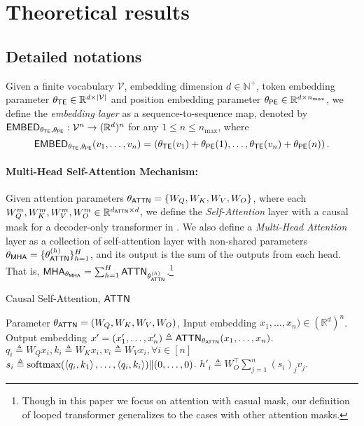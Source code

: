 \section{Theoretical results}\label{sec:appendix_proof}




\subsection{Detailed notations}
\label{sec:apx_detailed_notation}

\begin{definition}\label{defi:embedding_layer}
Given a finite vocabulary $\mathcal{V}$, embedding dimension $d\in\mathbb{N}^+$, token embedding parameter $\theta_{\mathsf{TE}}\in\mathbb{R}^{d\times |\mathcal{V}|}$ and position embedding parameter $\theta_{\mathsf{PE}}\in \mathbb{R}^{d\times n_{\max}}$, we define the \emph{embedding layer} as a sequence-to-sequence map, denoted by $\mathsf{EMBED}_{\theta_{\mathsf{TE}},\theta_{\mathsf{PE}}}:\mathcal{V}^n\to (\mathbb{R}^d)^n$ for any $1\le n\le n_{\max}$, where
\begin{equation}
    \mathsf{EMBED}_{\theta_{\mathsf{TE}},\theta_{\mathsf{PE}}}(v_1,\ldots,v_n) = \left(\theta_{\mathsf{TE}}(v_1)+ \theta_{\mathsf{PE}}(1), \ldots, \theta_{\mathsf{TE}}(v_n)+ \theta_{\mathsf{PE}}(n)  \right). 
\end{equation}
\end{definition}

\paragraph{Multi-Head Self-Attention Mechanism:} Given attention parameters $\theta_{\mathsf{ATTN}} = \{W_Q, W_K, W_V, W_O\}$, where each $W_Q^m, W_K^m, W_V^m, W_O^m \in \mathbb{R}^{d_{\mathsf{ATTN}} \times d }$, we define the \emph{Self-Attention} layer with a causal mask for a decoder-only transformer in . We also define a \emph{Multi-Head Attention} layer as a collection of self-attention layer with non-shared parameters $\theta_{\mathsf{MHA}} = \{\theta_{\mathsf{ATTN}}^{(h)}\}_{h=1}^H$, and its output is the sum of the outputs from each head. That is, $\mathsf{MHA}_{\theta_{\mathsf{MHA}}} = \sum_{h=1}^H \mathsf{ATTN}_{\theta_{\mathsf{ATTN}}^{(h)}}$.\footnote{Though in this paper we focus on attention with casual mask, our definition of looped transformer generalizes to the cases with other attention masks.}

\begin{algorithm}
    \caption{Causal Self-Attention, $\mathsf{ATTN}$}\label{alg:defi_attn}
    \begin{algorithmic}[1]
    \Require  Parameter $\theta_{\mathsf{ATTN}} = (W_Q,W_K,W_V,W_O)$, Input embedding $ x_1,\ldots, x_n)\in \left(\mathbb{R}^{d}\right)^n$.
    \Ensure Output embedding $x'= (x'_1,\ldots, x'_n) \triangleq \mathsf{ATTN}_{\theta_{\mathsf{ATTN}}}(x_1,\ldots, x_n)$.
    \State $q_i \triangleq W_Q  x_i, k_i \triangleq W_K x_i, v_i \triangleq W_V x_i, \forall i\in[n]$
    \State $s_i \triangleq \mathrm{softmax}(\left\langle q_i,k_1 \right\rangle,\ldots,\left\langle q_i,k_i \right\rangle) \| (0,\ldots, 0) $. 
    \State $h'_i \triangleq W_O^\top \sum_{j=1}^n (s_i)_j v_j$.
    \end{algorithmic}
    \end{algorithm}
